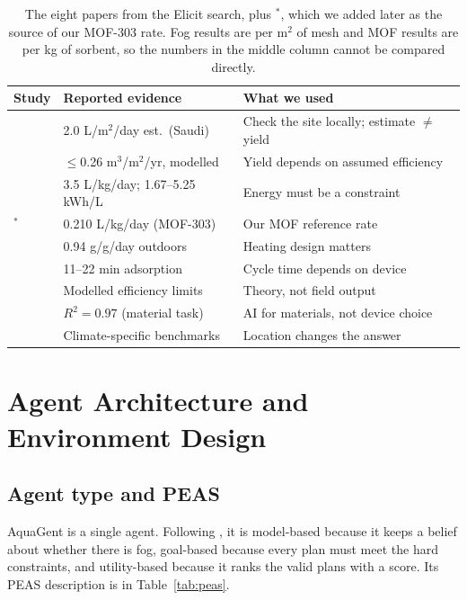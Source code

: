 \documentclass[11pt]{article}
\begin{document}
\begin{table}[t]
\centering
\small
\setlength{\tabcolsep}{3pt}
\begin{tabularx}{\columnwidth}{@{}p{2.15cm}X X@{}}
\toprule
\textbf{Study} & \textbf{Reported evidence} & \textbf{What we used} \\
\midrule
\citet{alzahrani2025fog} & 2.0 L/m$^2$/day est.\ (Saudi) & Check the site locally; estimate $\neq$ yield \\
\citet{perez2025catching} & $\le$0.26 m$^3$/m$^2$/yr, modelled & Yield depends on assumed efficiency \\
\citet{almassad2022adaptive} & 3.5 L/kg/day; 1.67--5.25 kWh/L & Energy must be a constraint \\
\citet{song2023mof}$^\ast$ & 0.210 L/kg/day (MOF-303) & Our MOF reference rate \\
\citet{luo2023solar} & 0.94 g/g/day outdoors & Heating design matters \\
\citet{fotia2026mil100} & 11--22 min adsorption & Cycle time depends on device \\
\citet{li2022thermo} & Modelled efficiency limits & Theory, not field output \\
\citet{li2022ml} & $R^2=0.97$ (material task) & AI for materials, not device choice \\
\citet{wang2023global} & Climate-specific benchmarks & Location changes the answer \\
\bottomrule
\end{tabularx}
\caption{The eight papers from the Elicit search, plus $^\ast$\citet{song2023mof}, which we added later as the source of our MOF-303 rate. Fog results are per m$^2$ of mesh and MOF results are per kg of sorbent, so the numbers in the middle column cannot be compared directly.}
\label{tab:related}
\end{table}

\newpage
\section{Agent Architecture and Environment Design}


\subsection{Agent type and PEAS}
AquaGent is a single agent. Following \citet{russell2021aima}, it is model-based because it keeps a belief about whether there is fog, goal-based because every plan must meet the hard constraints, and utility-based because it ranks the valid plans with a score. Its PEAS description is in Table~\ref{tab:peas}.
\end{document}
